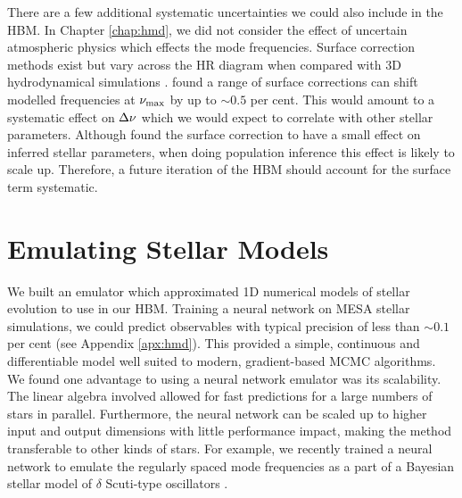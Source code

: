 There are a few additional systematic uncertainties we could also include in the HBM. In Chapter \ref{chap:hmd}, we did not consider the effect of uncertain atmospheric physics which effects the mode frequencies. Surface correction methods exist \citep[e.g.][]{Ball.Gizon2014,Kjeldsen.Bedding.ea2008} but vary across the HR diagram when compared with 3D hydrodynamical simulations \cite{Sonoi.Samadi.ea2015}. \citet{Compton.Bedding.ea2018} found a range of surface corrections can shift modelled frequencies at \({\nu_\mathrm{max}}\) by up to \(\sim 0.5\) per cent. This would amount to a systematic effect on \({\Delta\nu}\) which we would expect to correlate with other stellar parameters. Although \citet{Nsamba.Campante.ea2018} found the surface correction to have a small effect on inferred stellar parameters, when doing population inference this effect is likely to scale up. Therefore, a future iteration of the HBM should account for the surface term systematic.


\section{Emulating Stellar Models}\label{sec:conc-nn}

We built an emulator which approximated 1D numerical models of stellar evolution to use in our HBM. Training a neural network on MESA stellar simulations, we could predict observables with typical precision of less than \(\sim 0.1\) per cent (see Appendix \ref{apx:hmd}). This provided a simple, continuous and differentiable model well suited to modern, gradient-based MCMC algorithms. We found one advantage to using a neural network emulator was its scalability. The linear algebra involved allowed for fast predictions for a large numbers of stars in parallel. Furthermore, the neural network can be scaled up to higher input and output dimensions with little performance impact, making the method transferable to other kinds of stars. For example, we recently trained a neural network to emulate the regularly spaced mode frequencies as a part of a Bayesian stellar model of \(\delta\) Scuti-type oscillators \citep{Scutt.Murphy.ea2023}.

